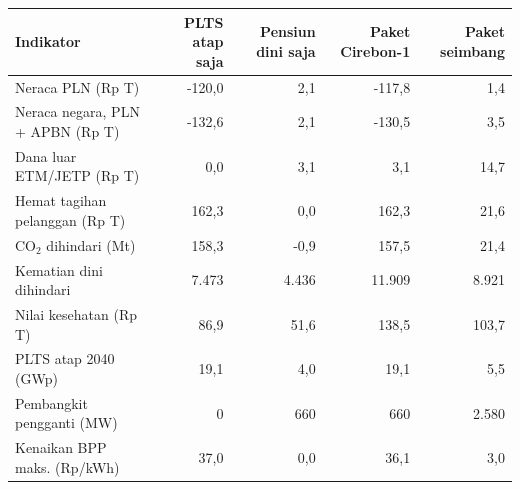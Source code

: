 \begin{tabular}{lrrrr}
\toprule
Indikator & PLTS atap saja & Pensiun dini saja & Paket Cirebon-1 & Paket seimbang \\
\midrule
Neraca PLN (Rp T) & -120,0 & 2,1 & -117,8 & 1,4 \\
Neraca negara, PLN + APBN (Rp T) & -132,6 & 2,1 & -130,5 & 3,5 \\
Dana luar ETM/JETP (Rp T) & 0,0 & 3,1 & 3,1 & 14,7 \\
Hemat tagihan pelanggan (Rp T) & 162,3 & 0,0 & 162,3 & 21,6 \\
CO$_2$ dihindari (Mt) & 158,3 & -0,9 & 157,5 & 21,4 \\
Kematian dini dihindari & 7.473 & 4.436 & 11.909 & 8.921 \\
Nilai kesehatan (Rp T) & 86,9 & 51,6 & 138,5 & 103,7 \\
PLTS atap 2040 (GWp) & 19,1 & 4,0 & 19,1 & 5,5 \\
Pembangkit pengganti (MW) & 0 & 660 & 660 & 2.580 \\
Kenaikan BPP maks. (Rp/kWh) & 37,0 & 0,0 & 36,1 & 3,0 \\
\bottomrule
\end{tabular}
